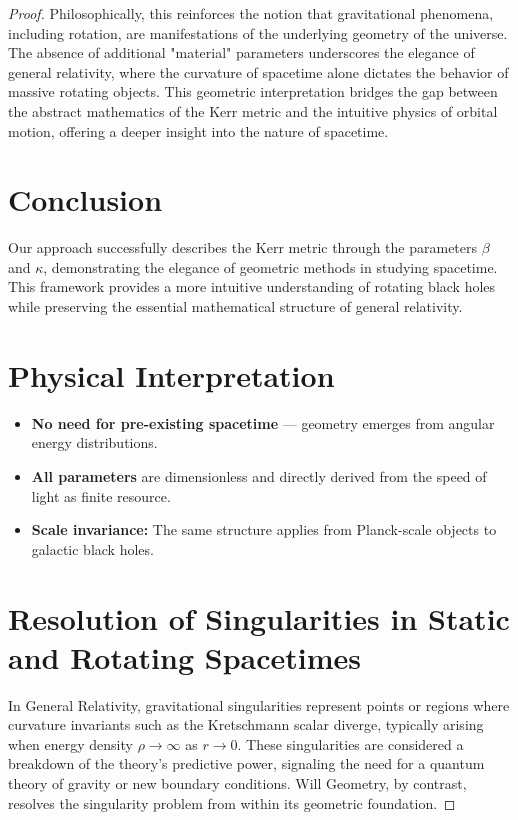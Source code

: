 \documentclass{article}
\begin{document}
\begin{theorem}
\begin{proof}
Philosophically, this reinforces the notion that gravitational phenomena, including rotation, are manifestations of the underlying geometry of the universe. The absence of additional "material" parameters underscores the elegance of general relativity, where the curvature of spacetime alone dictates the behavior of massive rotating objects. This geometric interpretation bridges the gap between the abstract mathematics of the Kerr metric and the intuitive physics of orbital motion, offering a deeper insight into the nature of spacetime.

\section{Conclusion}
Our approach successfully describes the Kerr metric through the parameters \(\beta\) and \(\kappa\), demonstrating the elegance of geometric methods in studying spacetime. This framework provides a more intuitive understanding of rotating black holes while preserving the essential mathematical structure of general relativity.


\section*{Physical Interpretation}

\begin{itemize}
  \item \textbf{No need for pre-existing spacetime} — geometry emerges from angular energy distributions.
  \item \textbf{All parameters} are dimensionless and directly derived from the speed of light as finite resource.
  \item \textbf{Scale invariance:} The same structure applies from Planck-scale objects to galactic black holes.
\end{itemize}

\section{Resolution of Singularities in Static and Rotating Spacetimes}

In General Relativity, gravitational singularities represent points or regions where curvature invariants such as the Kretschmann scalar diverge, typically arising when energy density \( \rho \to \infty \) as \( r \to 0 \). These singularities are considered a breakdown of the theory’s predictive power, signaling the need for a quantum theory of gravity or new boundary conditions. Will Geometry, by contrast, resolves the singularity problem from within its geometric foundation.


\end{proof}
\end{theorem}
\end{document}

